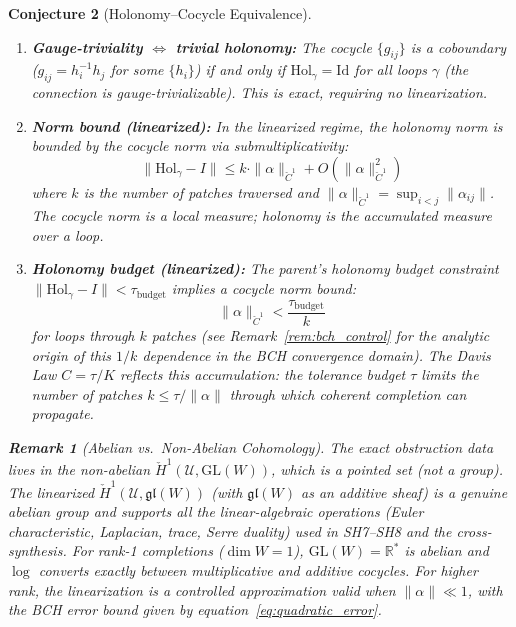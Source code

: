 \documentclass[11pt,letterpaper]{article}
\newtheorem{conjecture}{Conjecture}[section]
\newtheorem{remark}[conjecture]{Remark}
\newcommand{\Hol}{\mathrm{Hol}}
\newcommand{\tbudget}{\tau_{\mathrm{budget}}}
\newcommand{\Cech}{\check{C}}
\newcommand{\Hcech}{\check{H}}
\newcommand{\cover}{\mathcal{U}}
\begin{document}
\begin{conjecture}[Holonomy--Cocycle 
Equivalence]
\begin{enumerate}[label=(\alph*)]
    \item \textbf{Gauge-triviality $\iff$ trivial holonomy:} The 
    cocycle $\{g_{ij}\}$ is a coboundary ($g_{ij} = h_i^{-1} h_j$ 
    for some $\{h_i\}$) if and only if $\Hol_\gamma = \mathrm{Id}$ 
    for all loops $\gamma$ (the connection is gauge-trivializable). 
    This is exact, requiring no linearization.
    
    \item \textbf{Norm bound (linearized):} In the linearized regime, 
    the holonomy norm is bounded by the cocycle norm via 
    submultiplicativity:
    \begin{equation}\label{eq:norm_correspondence}
        \|\Hol_\gamma - I\| \leq k \cdot \|\alpha\|_{\Cech^1} 
        + O(\|\alpha\|_{\Cech^1}^2)
    \end{equation}
    where $k$ is the number of patches traversed and 
    $\|\alpha\|_{\Cech^1} = \sup_{i < j} \|\alpha_{ij}\|$. The 
    cocycle norm is a \emph{local} measure; holonomy is the 
    \emph{accumulated} measure over a loop.
    
    \item \textbf{Holonomy budget (linearized):} The parent's holonomy 
    budget constraint $\|\Hol_\gamma - I\| < \tbudget$ implies a 
    cocycle norm bound:
    \begin{equation}\label{eq:budget_cocycle}
        \|\alpha\|_{\Cech^1} < \frac{\tbudget}{k}
    \end{equation}
    for loops through $k$ patches (see 
    Remark~\ref{rem:bch_control} for the analytic origin of this 
    $1/k$ dependence in the BCH convergence domain). The Davis Law 
    $C = \tau / K$ reflects this accumulation: the tolerance budget 
    $\tau$ limits the number of patches 
    $k \leq \tau / \|\alpha\|$ through which 
    coherent completion can propagate.
\end{enumerate}

\begin{remark}[Abelian vs.\ Non-Abelian Cohomology]\label{rem:abelian}
The exact obstruction data lives in the non-abelian 
$\Hcech^1(\cover, \mathrm{GL}(W))$, which is a pointed set (not a 
group). The linearized $\Hcech^1(\cover, \mathfrak{gl}(W))$ 
(with $\mathfrak{gl}(W)$ as an additive sheaf) is a genuine abelian 
group and supports all the linear-algebraic operations (Euler 
characteristic, Laplacian, trace, Serre duality) used in SH7--SH8 
and the cross-synthesis. For rank-1 completions ($\dim W = 1$), 
$\mathrm{GL}(W) = \mathbb{R}^*$ is abelian and $\log$ converts 
exactly between multiplicative and additive cocycles. For higher 
rank, the linearization is a controlled approximation valid when 
$\|\alpha\| \ll 1$, with the BCH error bound given by 
equation~\eqref{eq:quadratic_error}.
\end{remark}


\end{conjecture}
\end{document}
